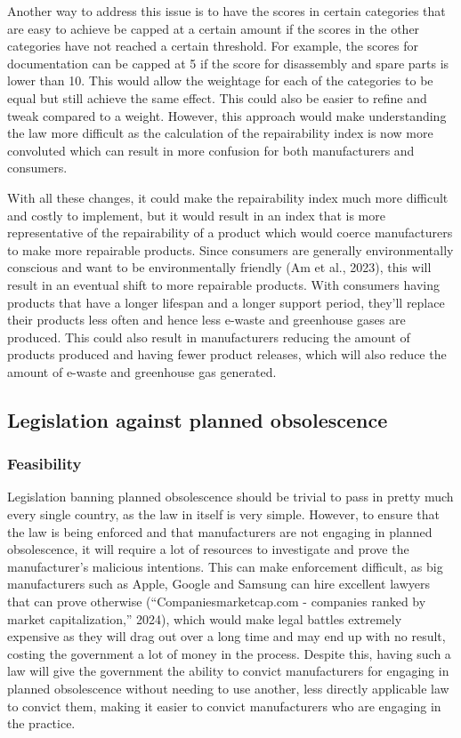 \documentclass[11pt]{article}
\makeatletter
\newcommand{\citeprocitem}[2]{\hyper@linkstart{cite}{citeproc_bib_item_#1}#2\hyper@linkend}
\makeatother
\begin{document}
 \noindent Another way to address this issue is to have the scores in certain categories that are easy to achieve be capped at a certain amount if the scores in the other categories have not reached a certain threshold. For example, the scores for documentation can be capped at 5 if the score for disassembly and spare parts is lower than 10. This would allow the weightage for each of the categories to be equal but still achieve the same effect. This could also be easier to refine and tweak compared to a weight. However, this approach would make understanding the law more difficult as the calculation of the repairability index is now more convoluted which can result in more confusion for both manufacturers and consumers.

 \newpage

 \noindent With all these changes, it could make the repairability index much more difficult and costly to implement, but it would result in an index that is more representative of the repairability of a product which would coerce manufacturers to make more repairable products. Since consumers are generally environmentally conscious and want to be environmentally friendly (\citeprocitem{1}{Am et al., 2023}), this will result in an eventual shift to more repairable products. With consumers having products that have a longer lifespan and a longer support period, they'll replace their products less often and hence less e-waste and greenhouse gases are produced. This could also result in manufacturers reducing the amount of products produced and having fewer product releases, which will also reduce the amount of e-waste and greenhouse gas generated.

 \newpage

\subsection{Legislation against planned obsolescence}
\label{sec:org05586eb}

\subsubsection{Feasibility}
\label{sec:orgeef4145}
Legislation banning planned obsolescence should be trivial to pass in pretty much every single country, as the law in itself is very simple. However, to ensure that the law is being enforced and that manufacturers are not engaging in planned obsolescence, it will require a lot of resources to investigate and prove the manufacturer's malicious intentions. This can make enforcement difficult, as big manufacturers such as Apple, Google and Samsung can hire excellent lawyers that can prove otherwise (\citeprocitem{6}{“Companiesmarketcap.com - companies ranked by market capitalization,” 2024}), which would make legal battles extremely expensive as they will drag out over a long time and may end up with no result, costing the government a lot of money in the process. Despite this, having such a law will give the government the ability to convict manufacturers for engaging in planned obsolescence without needing to use another, less directly applicable law to convict them, making it easier to convict manufacturers who are engaging in the practice.
\end{document}
